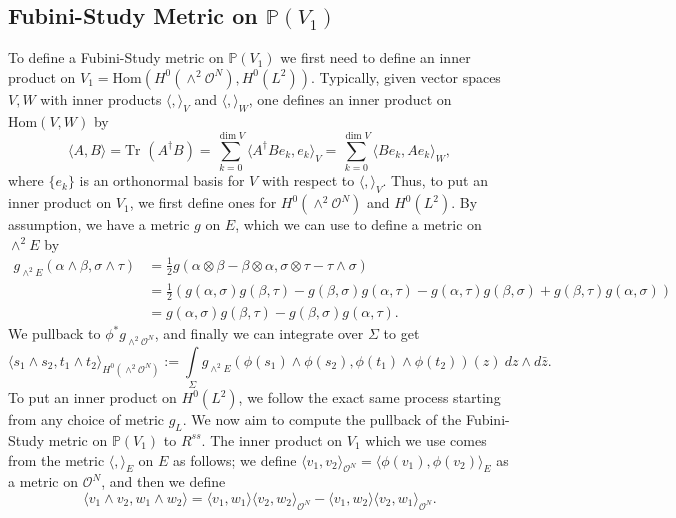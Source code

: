 \documentclass[]{article}
\newcommand{\Hom}{\text{Hom}}
\newcommand{\OO}{\mathcal{O}}
\newcommand{\PP}{\mathbb{P}}
\newcommand{\Tr}{\text{Tr }}
\begin{document}
	\subsection{Fubini-Study Metric on $\PP(V_1)$}
	To define a Fubini-Study metric on $\PP(V_1)$ we first need to define an inner product on $V_1 = \Hom(H^0(\wedge^2 \OO^N), H^0(L^2))$. Typically, given vector spaces $V,W$ with inner products $\langle,\rangle_V$ and $\langle,\rangle_W$, one defines an inner product on $\Hom(V,W)$ by
	\begin{equation}
		\langle A, B \rangle = \Tr(A^\dagger B) = \sum_{k=0}^{\dim V} \langle A^\dagger B e_k, e_k\rangle_V = \sum_{k=0}^{\dim V} \langle Be_k, Ae_k\rangle_W, 
	\end{equation}
	where $\{e_k\}$ is an orthonormal basis for $V$ with respect to $\langle,\rangle_V$. Thus, to put an inner product on $V_1$, we first define ones for $H^0(\wedge^2 \OO^N)$ and $H^0(L^2)$. By assumption, we have a metric $g$ on $E$, which we can use to define a metric on $\wedge^2 E$ by 
	\begin{align*}
		g_{\wedge^2 E}(\alpha \wedge \beta, \sigma\wedge \tau) &= \frac{1}{2}g(\alpha \otimes \beta - \beta\otimes \alpha, \sigma\otimes \tau - \tau \wedge \sigma)\\
		&= \frac{1}{2}\left(
		g(\alpha, \sigma)g(\beta,\tau) - g(\beta,\sigma)g(\alpha,\tau) - g(\alpha,\tau)g(\beta,\sigma) + g(\beta,\tau)g(\alpha,\sigma)
		\right)\\
		&= g(\alpha,\sigma)g(\beta,\tau) - g(\beta,\sigma)g(\alpha,\tau).
	\end{align*}
	We pullback to $\phi^\ast g_{\wedge^2 \OO^N}$, and finally we can integrate over $\Sigma$ to get 
	\begin{equation}
		\langle s_1 \wedge s_2, t_1\wedge t_2 \rangle_{H^0(\wedge^2\OO^N)} := \int\limits_{\Sigma} g_{\wedge^2 E}(\phi(s_1)\wedge \phi(s_2), \phi(t_1)\wedge \phi(t_2))(z) ~dz\wedge d\bar{z}.
	\end{equation}
	To put an inner product on $H^0(L^2)$, we follow the exact same process starting from any choice of metric $g_L$. 
	\fi
	\iffalse
	We now aim to compute the pullback of the Fubini-Study metric on $\PP(V_1)$ to $R^{ss}$. The inner product on $V_1$ which we use comes from the metric $\langle, \rangle_E$ on $E$ as follows; we define $\langle v_1, v_2 \rangle_{\OO^N} = \langle \phi(v_1), \phi(v_2)\rangle_E$ as a metric on $\OO^N$, and then we define 
	\begin{equation}
		\langle v_1 \wedge v_2, w_1 \wedge w_2 \rangle = \langle v_1, w_1\rangle\langle v_2,w_2\rangle_{\OO^N} - \langle v_1,w_2\rangle\langle v_2,w_1\rangle_{\OO^N}.
	\end{equation}
\end{document}

